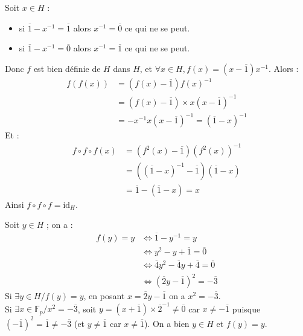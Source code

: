 \begin{solution}
Soit $x \in H$ :
\begin{itemize}
  \item si $\overline{1} - x^{-1} = \overline{1}$ alors $x^{-1} = \overline{0}$ ce qui ne se peut.
  \item si $\overline{1} - x^{-1} = \overline{0}$ alors $x^{-1} = \overline{1}$ ce qui ne se peut.
\end{itemize}
Donc $f$ est bien définie de $H$ dans $H$, et $\forall x \in H, f(x) = (x - \overline{1})x^{-1}$.
Alors :
\begin{align*}
f(f(x)) &= (f(x) - \overline{1}) f(x)^{-1} \\
&= (f(x) - \overline{1}) \times x (x - \overline{1})^{-1} \\
&= -x^{-1} x (x - \overline{1})^{-1} = (\overline{1} - x)^{-1}
\end{align*}
Et :
\begin{align*}
f \circ f \circ f(x) &= (f^2(x) - \overline{1}) (f^2(x))^{-1} \\
&= ((\overline{1} - x)^{-1} - \overline{1})(\overline{1} - x) \\
&= \overline{1} - (\overline{1} - x) = x
\end{align*}
Ainsi $f \circ f \circ f = \mathrm{id}_H$.

Soit $y \in H$ ; on a :
\begin{align*}
f(y) = y &\iff \overline{1} - y^{-1} = y \\
&\iff y^2 - y + \overline{1} = \overline{0} \\
&\iff \overline{4}y^2 - \overline{4}y + \overline{4} = \overline{0} \\
&\iff (\overline{2}y - \overline{1})^2 = -\overline{3}
\end{align*}
Si $\exists y \in H / f(y) = y$, en posant $x = \overline{2}y - \overline{1}$ on a $x^2 = -\overline{3}$. \\
Si $\exists x \in \mathbb{F}_p / x^2 = -\overline{3}$, soit $y = (x + \overline{1}) \times \overline{2}^{-1} \neq \overline{0}$ car $x \neq -\overline{1}$ puisque $(-\overline{1})^2 = \overline{1} \neq -\overline{3}$ (et $y \neq \overline{1}$ car $x \neq \overline{1}$).
On a bien $y \in H$ et $f(y) = y$.


\end{solution}
